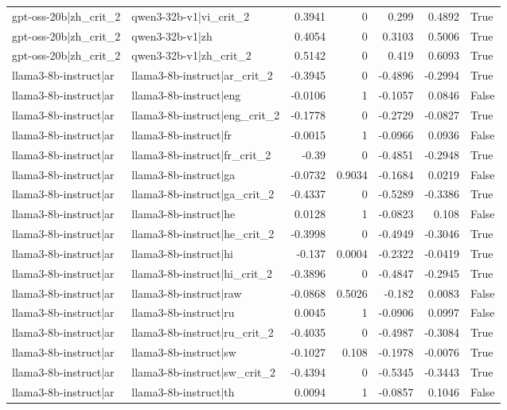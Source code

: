 \begin{table}
\begin{tabular}{l l r r r r l}
gpt-oss-20b|zh_crit_2 & qwen3-32b-v1|vi_crit_2 & 0.3941 & 0 & 0.299 & 0.4892 & True \\
gpt-oss-20b|zh_crit_2 & qwen3-32b-v1|zh & 0.4054 & 0 & 0.3103 & 0.5006 & True \\
gpt-oss-20b|zh_crit_2 & qwen3-32b-v1|zh_crit_2 & 0.5142 & 0 & 0.419 & 0.6093 & True \\
llama3-8b-instruct|ar & llama3-8b-instruct|ar_crit_2 & -0.3945 & 0 & -0.4896 & -0.2994 & True \\
llama3-8b-instruct|ar & llama3-8b-instruct|eng & -0.0106 & 1 & -0.1057 & 0.0846 & False \\
llama3-8b-instruct|ar & llama3-8b-instruct|eng_crit_2 & -0.1778 & 0 & -0.2729 & -0.0827 & True \\
llama3-8b-instruct|ar & llama3-8b-instruct|fr & -0.0015 & 1 & -0.0966 & 0.0936 & False \\
llama3-8b-instruct|ar & llama3-8b-instruct|fr_crit_2 & -0.39 & 0 & -0.4851 & -0.2948 & True \\
llama3-8b-instruct|ar & llama3-8b-instruct|ga & -0.0732 & 0.9034 & -0.1684 & 0.0219 & False \\
llama3-8b-instruct|ar & llama3-8b-instruct|ga_crit_2 & -0.4337 & 0 & -0.5289 & -0.3386 & True \\
llama3-8b-instruct|ar & llama3-8b-instruct|he & 0.0128 & 1 & -0.0823 & 0.108 & False \\
llama3-8b-instruct|ar & llama3-8b-instruct|he_crit_2 & -0.3998 & 0 & -0.4949 & -0.3046 & True \\
llama3-8b-instruct|ar & llama3-8b-instruct|hi & -0.137 & 0.0004 & -0.2322 & -0.0419 & True \\
llama3-8b-instruct|ar & llama3-8b-instruct|hi_crit_2 & -0.3896 & 0 & -0.4847 & -0.2945 & True \\
llama3-8b-instruct|ar & llama3-8b-instruct|raw & -0.0868 & 0.5026 & -0.182 & 0.0083 & False \\
llama3-8b-instruct|ar & llama3-8b-instruct|ru & 0.0045 & 1 & -0.0906 & 0.0997 & False \\
llama3-8b-instruct|ar & llama3-8b-instruct|ru_crit_2 & -0.4035 & 0 & -0.4987 & -0.3084 & True \\
llama3-8b-instruct|ar & llama3-8b-instruct|sw & -0.1027 & 0.108 & -0.1978 & -0.0076 & True \\
llama3-8b-instruct|ar & llama3-8b-instruct|sw_crit_2 & -0.4394 & 0 & -0.5345 & -0.3443 & True \\
llama3-8b-instruct|ar & llama3-8b-instruct|th & 0.0094 & 1 & -0.0857 & 0.1046 & False \\

\end{tabular}
\end{table}
